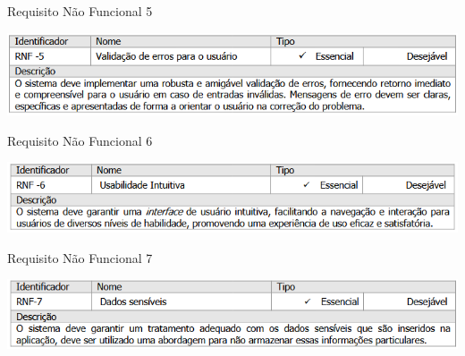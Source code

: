 \begin{table}[H]
    \caption{Requisito Não Funcional 5}\label{tab:rnf5}
    \centering
    \includegraphics[scale=0.8]{imagens/rnf5.png}
\end{table}
\begin{table}[H]
    \caption{Requisito Não Funcional 6}\label{tab:rnf6}
    \centering
    \includegraphics[scale=0.8]{imagens/rnf6.png}
\end{table}
\begin{table}[H]
    \caption{Requisito Não Funcional 7}\label{tab:rnf6}
    \centering
    \includegraphics[scale=0.8]{imagens/rnf7.png}
\end{table}



